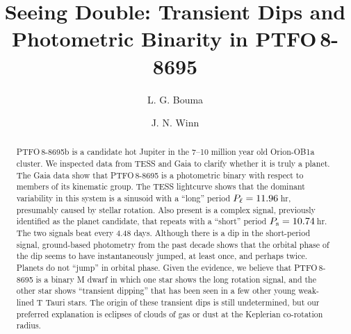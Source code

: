 \documentclass[12pt,twocolumn,tighten]{aastex62}
\begin{document}

\title{Seeing Double: Transient Dips and Photometric Binarity in
PTFO$\,$8-8695}


%
%
\author[0000-0002-0514-5538]{L. G. Bouma}
%
\author[0000-0002-4265-047X]{J. N. Winn}

\begin{abstract}
  PTFO$\,$8-8695b is a candidate hot Jupiter in the 7--10 million year
  old Orion-OB1a cluster. We inspected data from TESS and Gaia to
  clarify whether it is truly a planet.  The Gaia data show that
  PTFO$\,$8-8695 is a photometric binary with respect to members of
  its kinematic group.  The TESS lightcurve shows that the dominant
  variability in this system is a sinusoid with a ``long'' period
  $P_{\rm \ell}=11.96\,$hr, presumably caused by stellar rotation.
  Also present is a complex signal, previously identified as the
  planet candidate, that repeats with a ``short'' period $P_{\rm s}=
  10.74\,$hr.  The two signals beat every 4.48 days.  Although there
  is a dip in the short-period signal, ground-based photometry from
  the past decade shows that the orbital phase of the dip seems to
  have instantaneously jumped, at least once, and perhaps twice.
  Planets do not ``jump'' in orbital phase.  Given the evidence, we
  believe that PTFO$\,$8-8695 is a binary M dwarf in which one star
  shows the long rotation signal, and the other star shows
  ``transient dipping'' that has been seen in a few other young
  weak-lined T Tauri stars.  The origin of these transient dips is
  still undetermined, but our preferred explanation is eclipses of
  clouds of gas or dust at the Keplerian co-rotation radius.
\end{abstract}

\end{document}
